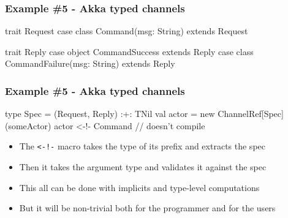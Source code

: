 \documentclass[svgnames,hyperref={bookmarks=false}]{beamer}
\begin{document}
\begin{frame}[fragile, t]
\frametitle{Example \#5 - Akka typed channels}

\begin{semiverbatim}
trait Request
case class Command(msg: String) extends Request

trait Reply
case object CommandSuccess extends Reply
case class CommandFailure(msg: String) extends Reply

\alert{}

\end{semiverbatim}

\begin{itemize}
\end{itemize}
\end{frame}

\begin{frame}[fragile]
\frametitle{Example \#5 - Akka typed channels}

\begin{semiverbatim}
type Spec = (Request, Reply) :+: TNil
val actor = new ChannelRef[Spec](someActor)
\alert{actor <-!- Command // doesn't compile}

\end{semiverbatim}

\begin{itemize}
\item The \texttt{<-!-} macro takes the type of its prefix and extracts the spec
\item Then it takes the argument type and validates it against the spec
\item This all can be done with implicits and type-level computations
\item But it will be non-trivial both for the programmer and for the users
\end{itemize}
\end{frame}
\end{document}
